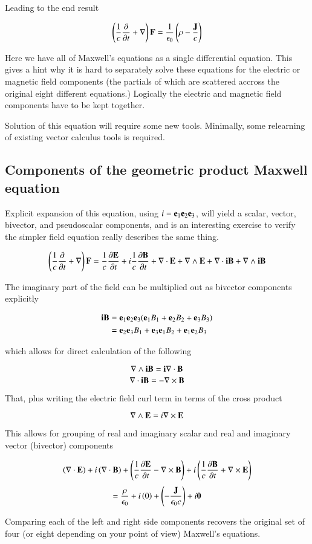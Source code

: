 \documentclass{article}      %
\begin{document}
Leading to the end result

\[
\left(\frac{1}{c} \frac{\partial}{\partial t} + \nabla\right)\mathbf{F} = \frac {1} {\epsilon_0}\left(\rho - \frac{\mathbf{J}}{c}\right)
\]

Here we have all of Maxwell's equations as a single differential equation.
This gives a hint why it is hard to separately solve these equations for the electric or magnetic field components (the partials of which are scattered accross the original eight different equations.)  Logically the electric and magnetic field components have to be kept together.

Solution of this equation will require some new tools.  Minimally, some relearning of existing vector calculus tools is required.

\subsection{Components of the geometric product Maxwell equation }

Explicit expansion of this equation, using $i={\mathbf{e}}_1{\mathbf{e}}_2{\mathbf{e}}_3$, will yield a scalar, vector, bivector, and pseudoscalar components, and is an interesting exercise to verify the simpler field equation really describes the same thing.

\[
\left(\frac{1}{c} \frac{\partial}{\partial t} + \nabla\right)\mathbf{F}
= \frac{1}{c} \frac{\partial \mathbf{E}}{\partial t} + i\frac{1}{c} \frac{\partial \mathbf{B}}{\partial t}
+ \nabla \cdot \mathbf{E} + \nabla \wedge \mathbf{E} + \nabla \cdot \mathbf{i} \mathbf{B} + \nabla \wedge \mathbf{i} \mathbf{B}
\]

The imaginary part of the field can be multiplied out as bivector components explicitly

\begin{align*}
\mathbf{i} \mathbf{B} &= \mathbf{e} _1 \mathbf{e} _2 \mathbf{e} _3 ( \mathbf{e} _1 B_1 + \mathbf{e} _2 B_2 + \mathbf{e} _3 B_3 ) \\
&= \mathbf{e} _2 \mathbf{e} _3 B_1 + \mathbf{e} _3 \mathbf{e} _1 B_2 + \mathbf{e} _1 \mathbf{e} _2 B_3
\end{align*}

which allows for direct calculation of the following

\[
\nabla \wedge \mathbf{i}\mathbf{B} = \mathbf{i}\nabla \cdot \mathbf{B}
\]
\[
\nabla \cdot \mathbf{i}\mathbf{B} = -\nabla \times \mathbf{B}
\]

That, plus writing the electric field curl term in terms of the cross product

\[
\nabla \wedge \mathbf{E} = i \nabla \times \mathbf{E}
\]

This allows for grouping of real and imaginary scalar and real and imaginary vector (bivector) components

\[
   \left(\nabla \cdot \mathbf{E}\right) + i\left(\nabla \cdot \mathbf{B}\right)
+
   \left(\frac{1}{c} \frac{\partial \mathbf{E}}{\partial t} - \nabla \times \mathbf{B}\right)
+ i\left(\frac{1}{c} \frac{\partial \mathbf{B}}{\partial t} + \nabla \times \mathbf{E}\right)
\]
\[
= \frac{\rho}{\epsilon_0} + i\left(0\right) + \left(-\frac{\mathbf{J}}{\epsilon_0 c}\right) + i \mathbf{0}
\]

Comparing each of the left and right side components recovers the original set of four (or eight depending on your point of view) Maxwell's equations.
\end{document}
